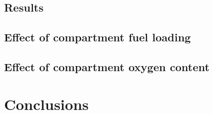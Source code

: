\documentclass[12pt,letterpaper]{article}
\begin{document}
\begin{flushleft}
\subsection{Results} \addvspace{10pt}
\label{sec:results}

\subsection{Effect of compartment fuel loading}
\label{sec:resfuel}


\subsection{Effect of compartment oxygen content}
\label{sec:resfuel}


\section{Conclusions}



 



\end{flushleft}
\end{document}

